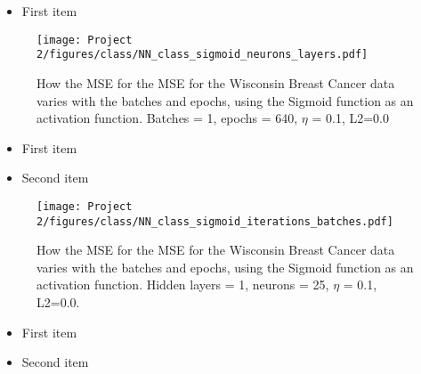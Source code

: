 \documentclass[english,notitlepage,reprint,nofootinbib]{revtex4-2}  %
\begin{document}
\begin{itemize}
\color{white}
\item First item
\end{itemize}

\begin{figure}[h!]
    \centering %
    \texttt{[image: Project 2/figures/class/NN\_class\_sigmoid\_neurons\_layers.pdf]} 
    \caption{How the MSE for the MSE for the Wisconsin Breast Cancer data varies with the batches and epochs, using the Sigmoid function as an activation function. Batches = 1, epochs = 640, $\eta$ = 0.1, L2=0.0
    }
    \label{fig: nn_neuron_layer}
\end{figure}


\begin{itemize}
\color{white}
\item First item
\item Second item
\end{itemize}

\begin{figure}[h!]
    \centering %
    \texttt{[image: Project 2/figures/class/NN\_class\_sigmoid\_iterations\_batches.pdf]} 
    \caption{How the MSE for the MSE for the Wisconsin Breast Cancer data varies with the batches and epochs, using the Sigmoid function as an activation function. Hidden layers = 1, neurons = 25, $\eta$ = 0.1, L2=0.0. 
    }
    \label{fig: nn_iter_batch}
\end{figure}


\begin{itemize}
\color{white}
\item First item
\item Second item
\end{itemize}














\onecolumngrid
%
\end{document}
